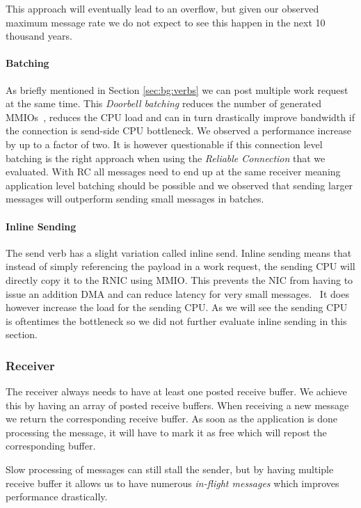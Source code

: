 This approach will eventually lead to an overflow, but given our observed maximum message rate we do not expect to see this 
happen in the next 10 thousand years. 


\paragraph{Batching} As briefly mentioned in Section \ref{sec:bg:verbs}  we can post multiple work request at the same time. 
This \emph{Doorbell batching} reduces the number of generated MMIOs~\cite{anuj-guide}, reduces the CPU load and can in turn 
drastically improve bandwidth if the connection is send-side CPU bottleneck. We observed a performance increase by up to 
a factor of two. It is however questionable if this connection level batching is the right approach when using the 
\emph{Reliable Connection} that we evaluated. With RC all messages need to end up at the same receiver meaning application 
level batching should be possible and we observed that sending larger messages will outperform sending small messages in 
batches.

\paragraph{Inline Sending} The send verb has a slight variation called inline send. Inline sending means that instead of 
simply referencing the payload in a work request, the sending CPU will directly copy it to the RNIC using MMIO. This prevents
the NIC from having to issue an addition DMA and can reduce latency for very small messages.~\cite{anuj-guide} It does however
increase the load for the sending CPU. As we will see the sending CPU is oftentimes the bottleneck so we did not further 
evaluate inline sending in this section.

\subsubsection{Receiver}

The receiver always needs to have at least one posted receive buffer. We achieve this by having an array of posted receive 
buffers. When receiving a new message we return the corresponding receive buffer. As soon as the application is done processing
the message, it will have to mark it as free which will repost the corresponding buffer.


Slow processing of messages can still stall the sender, but by having multiple receive buffer it allows us to have numerous 
\emph{in-flight messages} which improves performance drastically.

